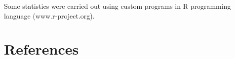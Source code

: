 \documentclass[10pt,a4paper]{article}
\begin{document}
Some statistics were carried out using custom programs in R programming language (www.r-project.org).


\section{References}


\end{document}
